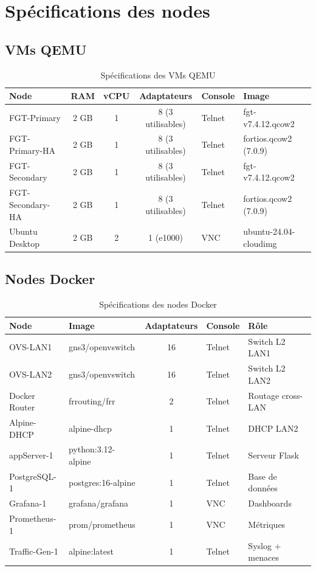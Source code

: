 \section{Spécifications des nodes}

\subsection{VMs QEMU}

\begin{table}[H]
\centering
\caption{Spécifications des VMs QEMU}
\label{tab:qemu-specs}
\begin{tabularx}{\textwidth}{|l|c|c|c|l|X|}
\hline
\textbf{Node} & \textbf{RAM} & \textbf{vCPU} & \textbf{Adaptateurs} & \textbf{Console} & \textbf{Image} \\
\hline
FGT-Primary & 2 GB & 1 & 8 (3 utilisables) & Telnet & fgt-v7.4.12.qcow2 \\
FGT-Primary-HA & 2 GB & 1 & 8 (3 utilisables) & Telnet & fortios.qcow2 (7.0.9) \\
FGT-Secondary & 2 GB & 1 & 8 (3 utilisables) & Telnet & fgt-v7.4.12.qcow2 \\
FGT-Secondary-HA & 2 GB & 1 & 8 (3 utilisables) & Telnet & fortios.qcow2 (7.0.9) \\
Ubuntu Desktop & 2 GB & 2 & 1 (e1000) & VNC & ubuntu-24.04-cloudimg \\
\hline
\end{tabularx}
\end{table}

\subsection{Nodes Docker}

\begin{table}[H]
\centering
\caption{Spécifications des nodes Docker}
\label{tab:docker-specs}
\begin{tabularx}{\textwidth}{|l|l|c|l|X|}
\hline
\textbf{Node} & \textbf{Image} & \textbf{Adaptateurs} & \textbf{Console} & \textbf{Rôle} \\
\hline
OVS-LAN1 & gns3/openvswitch & 16 & Telnet & Switch L2 LAN1 \\
OVS-LAN2 & gns3/openvswitch & 16 & Telnet & Switch L2 LAN2 \\
Docker Router & frrouting/frr & 2 & Telnet & Routage cross-LAN \\
Alpine-DHCP & alpine-dhcp & 1 & Telnet & DHCP LAN2 \\
appServer-1 & python:3.12-alpine & 1 & Telnet & Serveur Flask \\
PostgreSQL-1 & postgres:16-alpine & 1 & Telnet & Base de données \\
Grafana-1 & grafana/grafana & 1 & VNC & Dashboards \\
Prometheus-1 & prom/prometheus & 1 & VNC & Métriques \\
Traffic-Gen-1 & alpine:latest & 1 & Telnet & Syslog + menaces \\
\hline
\end{tabularx}
\end{table}


